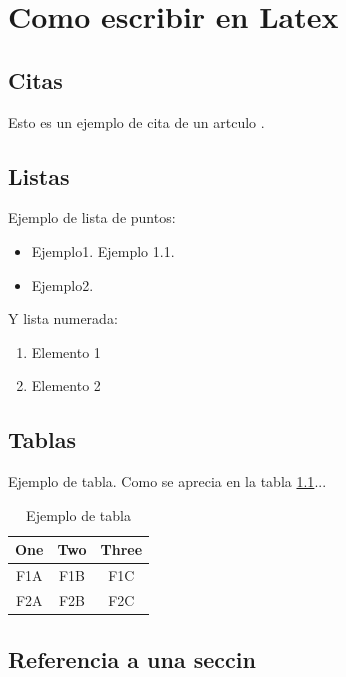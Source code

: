 \chapter{Como escribir en Latex}

\section{Citas}


Esto es un ejemplo de cita de un artculo \cite{Brunete:2013}.


\section{Listas}

Ejemplo de lista de puntos:
\begin{itemize}
\item Ejemplo1.
    \subitem Ejemplo 1.1.
\item Ejemplo2.
\end{itemize}

Y lista numerada:
\begin{enumerate}
\item Elemento 1
\item Elemento 2
\end{enumerate}

\section{Tablas}

Ejemplo de tabla. Como se aprecia en la tabla \ref{tab:table_example}...
\begin{table}[tb]
\caption{Ejemplo de tabla}
\label{tab:table_example}
\begin{center}
\begin{tabular}{|c||c|c|}
\hline
One & Two & Three\\
\hline
F1A & F1B & F1C\\
F2A & F2B & F2C\\
\hline
\end{tabular}
\end{center}
\end{table}

\section{Referencia a una seccin}
\label{sec:refsec}

